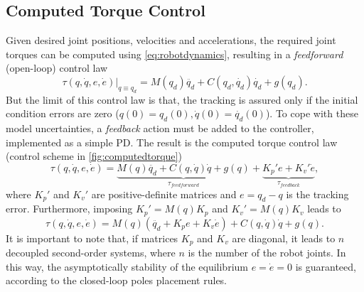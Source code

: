 \subsection{Computed Torque Control}
Given desired joint positions, velocities and accelerations, the required joint torques can be computed using \eqref{eq:robotdynamics}, resulting in a \textit{feedforward} (open-loop) control law
\begin{equation*}
\tau(q,\dot{q},e,\dot{e})\vert_{q \equiv q_d} = M(q_d)\ddot{q_d} + C(q_d,\dot{q_d})\dot{q_d} + g(q_d).
\end{equation*}
But the limit of this control law is that, the tracking is assured only if the initial condition errors are zero ($ q(0)=q_d(0),\dot{q}(0)=\dot{q_d}(0) $). To cope with these model uncertainties, a \textit{feedback} action must be added to the controller, implemented as a simple PD. The result is the computed torque control law (control scheme in \autoref{fig:computedtorque})
\begin{equation}
\tau(q,\dot{q},e,\dot{e}) = \underbrace{M(q)\ddot{q_d} + C(q,\dot{q})\dot{q} + g(q)}_{\tau_{feedforward}} + 
\underbrace{K_p'e + K_v'\dot{e}}_{\tau_{feedback}},
\end{equation}
where $ K_p' $ and $ K_v' $ are positive-definite matrices and $ e = q_d-q $ is the tracking error.
Furthermore, imposing $ K_p' = M(q)K_p $ and $ K_v' = M(q)K_v $ leads to
\begin{equation}
\tau(q,\dot{q},e,\dot{e}) = M(q)(\ddot{q_d} + K_{p}e + K_{v}\dot{e}) + C(q,\dot{q})\dot{q} + g(q).
\end{equation}
It is important to note that, if matrices $ K_p $ and $ K_v $ are diagonal, it leads to $ n $ decoupled second-order systems, where $ n $ is the number of the robot joints. In this way, the asymptotically stability of the equilibrium $ e = \dot{e} =0 $ is guaranteed, according to the closed-loop poles placement rules.

